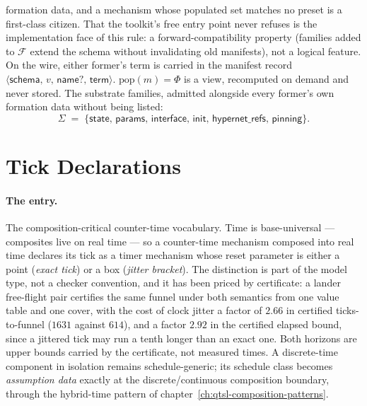 {formation data, and a mechanism whose populated set matches no
preset is a first-class citizen. That the toolkit's free entry point
never refuses is the implementation face of this rule: a
forward-compatibility property (families added to $\mathcal{F}$
extend the schema without invalidating old manifests), not a logical
feature. On the wire, either former's term is carried in the
manifest record $\langle \mathsf{schema},\, v,\, \mathsf{name}?,\,
\mathsf{term} \rangle$. $\mathrm{pop}(m) = \Phi$ is a view,
recomputed on demand and never stored. The substrate families,
admitted alongside every former's own formation data without being
listed:
\[
\Sigma \;=\; \{\mathsf{state},\, \mathsf{params},\,
\mathsf{interface},\, \mathsf{init},\, \mathsf{hypernet\_refs},\,
\mathsf{pinning}\}.
\]}


\section{Tick Declarations}
\label{sec:mt-tick}

\paragraph{The entry.} The composition-critical counter-time
vocabulary. Time is base-universal --- composites live on real time
--- so a counter-time mechanism composed into real time declares its
tick as a timer mechanism whose reset parameter is either a point
(\emph{exact tick}) or a box (\emph{jitter bracket}). The distinction
is part of the model type, not a checker convention, and it has been
priced by certificate: a lander free-flight pair certifies the same
funnel under both semantics from one value table and one cover, with
the cost of clock jitter a factor of $2.66$ in certified
ticks-to-funnel ($1631$ against $614$), and a factor $2.92$ in the
certified elapsed bound, since a jittered tick may run a tenth longer
than an exact one. Both horizons are upper bounds carried by the
certificate, not measured times. A discrete-time component in
isolation remains
schedule-generic; its schedule class becomes \emph{assumption data}
exactly at the discrete/continuous composition boundary, through the
hybrid-time pattern of
chapter~\ref{ch:qtsl-composition-patterns}.



